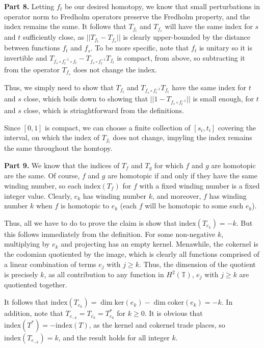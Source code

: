 \documentclass[aps,pra,showpacs,notitlepage,onecolumn,superscriptaddress,nofootinbib]{revtex4-1}
\theoremstyle{definition}
\begin{document}
\noindent \textbf{Part 8.} Letting $f_t$ be our desired homotopy, we know that small perturbations in operator norm to Fredholm operators preserve
the Fredholm property, and the index remains the same. It follows that $T_{f_t}$ and $T_{f_s}$ will have the same index for $s$ and $t$
sufficiently close, as $||T_{f_t} - T_{f_s}||$ is clearly upper-bounded by the distance between functions $f_t$ and $f_s$.
To be more specific, note that $f_t$ is unitary so it is invertible and $T_{f_s \circ f_t^{-1} \circ f_t} - T_{f_s \circ f_t^{-1}} T_{f_t}$ is compact,
from above, so subtracting it from the operator $T_{f_s}$ does not change the index.
\newline

\noindent Thus, we simply need to show that $T_{f_t}$ and $T_{f_s \circ f_t^{-1}} T_{f_t}$ have the same index for $t$ and $s$ close, which boils down
to showing that $||1 - T_{f_s \circ f_t^{-1}}||$ is small enough, for $t$ and $s$ close, which is striaghtforward from the definitions.
\newline

\noindent Since $[0, 1]$ is compact, we can choose a finite collection of $[s_i, t_i]$ covering the interval,
on which the index of $T_{f_t}$ does not change, impyling the index remains the same throughout the homtopy.
\newline

\noindent \textbf{Part 9.} We know that the indices of $T_f$ and $T_g$ for which $f$ and $g$ are homotopic are the same. Of course,
$f$ and $g$ are homotopic if and only if they have the same winding number, so each $\text{index}(T_f)$ for $f$ with a fixed winding
number is a fixed integer value. Clearly, $e_k$ has winding number $k$, and moreover, $f$ has winding number $k$ when $f$ is homotopic to $e_k$ (each
$f$ will be homotopic to some such $e_k$).
\newline

\noindent Thus, all we have to do to prove the claim is show that $\text{index}(T_{e_k}) = -k$. But this follows immediately from the definition. For
some non-negative $k$, multiplying by $e_k$ and projecting has an empty kernel. Menawhile, the cokernel is the codomian quotiented by the image,
which is clearly all functions comprised of a linear combination of terms $e_j$ with $j \geq k$. Thus, the dimension of the quotient is precisely $k$,
as all contribution to any function in $H^2(\mathbb{T})$, $e_j$ with $j \geq k$ are quotiented together.
\newline

It follows that $\text{index}(T_{e_k}) = \dim \text{ker}(e_k) - \dim \text{coker}(e_k) = -k$. In addition, note that $T_{e_{-k}} = T_{\overline{e_k}} = T^{*}_{e_k}$
for $k \geq 0$. It is obvious that $\text{index}(T^{*}) = -\text{index}(T)$, as the kernel and cokernel trade places, so $\text{index}(T_{e_{-k}}) = k$, and the result holds
for all integer $k$.
\end{document}
